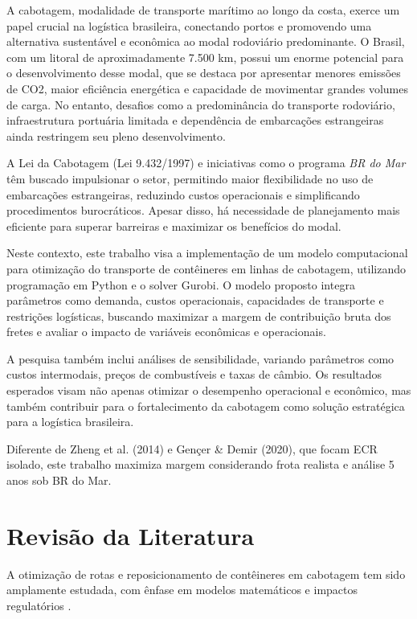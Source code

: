 \documentclass[preprint,10pt,5p]{elsarticle}
\begin{document}
A cabotagem, modalidade de transporte marítimo ao longo da costa, exerce um papel crucial na logística brasileira, conectando portos e promovendo uma alternativa sustentável e econômica ao modal rodoviário predominante. O Brasil, com um litoral de aproximadamente 7.500 km, possui um enorme potencial para o desenvolvimento desse modal, que se destaca por apresentar menores emissões de CO2, maior eficiência energética e capacidade de movimentar grandes volumes de carga. No entanto, desafios como a predominância do transporte rodoviário, infraestrutura portuária limitada e dependência de embarcações estrangeiras ainda restringem seu pleno desenvolvimento.

A Lei da Cabotagem (Lei 9.432/1997) e iniciativas como o programa \textit{BR do Mar} têm buscado impulsionar o setor, permitindo maior flexibilidade no uso de embarcações estrangeiras, reduzindo custos operacionais e simplificando procedimentos burocráticos. Apesar disso, há necessidade de planejamento mais eficiente para superar barreiras e maximizar os benefícios do modal.

Neste contexto, este trabalho visa a implementação de um modelo computacional para otimização do transporte de contêineres em linhas de cabotagem, utilizando programação em Python e o solver Gurobi. O modelo proposto integra parâmetros como demanda, custos operacionais, capacidades de transporte e restrições logísticas, buscando maximizar a margem de contribuição bruta dos fretes e avaliar o impacto de variáveis econômicas e operacionais.

A pesquisa também inclui análises de sensibilidade, variando parâmetros como custos intermodais, preços de combustíveis e taxas de câmbio. Os resultados esperados visam não apenas otimizar o desempenho operacional e econômico, mas também contribuir para o fortalecimento da cabotagem como solução estratégica para a logística brasileira.

Diferente de Zheng et al. (2014)\cite{zhen2014} e Gençer \& Demir (2020)\cite{gencer2020}, que focam ECR isolado, este trabalho maximiza margem considerando frota realista e análise 5 anos sob BR do Mar.


\section{Revisão da Literatura}
\label{sec:literatura}

A otimização de rotas e reposicionamento de contêineres em cabotagem tem sido amplamente estudada, com ênfase em modelos matemáticos e impactos regulatórios \cite{zhen2014,gencer2020}.
\end{document}
